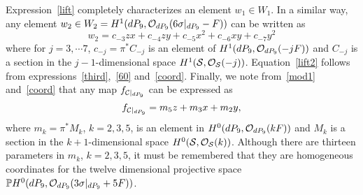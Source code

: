 \documentclass[a4paper,12pt]{article}
\numberwithin{equation}{section}
\theoremstyle{plain}
\begin{document}
Expression~\eqref{lift} completely characterizes an element
$w_1 \in W_1$. In a similar way, any element
$w_2 \in W_2= H^{1}(dP_9, {\cal O}_{dP_9} (6 \sigma|_{dP_9} -F))$
can be written
as
%
\begin{equation}
w_{2} = c_{-3} zx + c_{-4} zy + c_{-5} x^2 + c_{-6}xy + c_{-7} y^2
\label{lift2}
\end{equation}
%
where for $j=3, \cdots 7$, $c_{-j}=\pi^{*}C_{-j}$ is an element of
$H^{1}(dP_9, {\cal O}_{dP_9} (-jF))$ and $C_{-j}$ is a section in the
$j-1$-dimensional space $H^{1}({\cal{S}}, {\cal{O}}_{{\cal{S}}}(-j))$.
Equation~\eqref{lift2} follows from expressions~\eqref{third},~\eqref{60}
and~\eqref{coord}. Finally, we note from~\eqref{mod1} and~\eqref{coord} that
any map
$f_{{\cal{C}}|_{dP_{9}}}$ can be expressed as
%
\begin{equation}
f_{{\cal{C}}|_{dP_{9}}} = m_5 z + m_3 x + m_2 y,
\label{lift3}
\end{equation}
%
where $m_k=\pi^{*}M_{k}$, $k=2, 3, 5$, is an element in
$H^{0}(dP_9, {\cal O}_{dP_9} (kF))$ and $M_{k}$ is a section in the
$k+1$-dimensional space $H^{0}({\cal{S}},{\cal{O}}_{{\cal{S}}}(k))$.
Although
there are thirteen parameters in $m_{k}$, $k=2,3,5$, it must be remembered
that
they are homogeneous coordinates for the twelve dimensional projective
space
${\mathbb P}H^{0}(dP_9, {\cal O}_{dP_9} (3 \sigma|_{dP_9} +5F))$.
\end{document}
